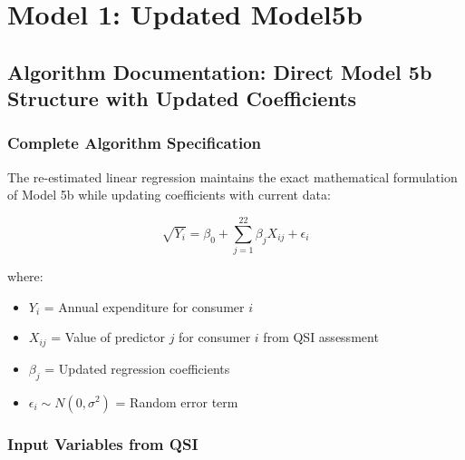\chapter{Model 1: Updated Model5b}\newpage

\section{Algorithm Documentation: Direct Model 5b Structure with Updated Coefficients}

\subsection{Complete Algorithm Specification}

The re-estimated linear regression maintains the exact mathematical formulation of Model 5b while updating coefficients with current data:

\begin{equation}
\sqrt{Y_i} = \beta_0 + \sum_{j=1}^{22} \beta_j X_{ij} + \epsilon_i
\end{equation}

where:
\begin{itemize}
    \item $Y_i$ = Annual expenditure for consumer $i$
    \item $X_{ij}$ = Value of predictor $j$ for consumer $i$ from QSI assessment
    \item $\beta_j$ = Updated regression coefficients
    \item $\epsilon_i \sim N(0, \sigma^2)$ = Random error term
\end{itemize}

\subsection{Input Variables from QSI}

